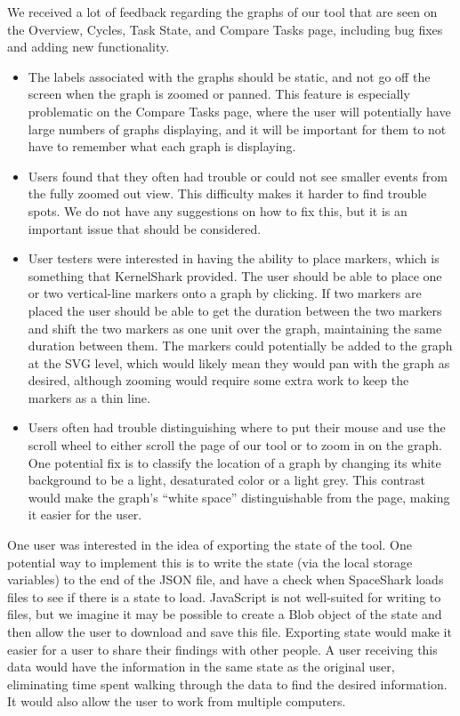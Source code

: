 \documentclass{hmcclinic}
\begin{document}
We received a lot of feedback regarding the graphs of our tool that are seen on the Overview, Cycles, Task State, and Compare Tasks page, including bug fixes and adding new functionality.
  \begin{itemize}

  \item The labels associated with the graphs should be static, and not go off the screen when 
  the graph is zoomed or panned. This feature is especially problematic on the Compare Tasks page, 
  where the user will potentially have large numbers of graphs displaying, and it will be 
  important for them to not have to remember what each graph is displaying.

  \item Users found that they often had trouble or could not see smaller events 
  from the fully zoomed out view. This difficulty makes it harder to find trouble spots. We do not 
  have any suggestions on how to fix this, but it is an important issue that should be 
  considered.

  \item User testers were interested in having the ability to place markers, which 
  is something that KernelShark provided. The user should be able to place one or two
   vertical-line markers onto a graph by clicking. If two markers are placed the user should
    be able to get the duration between the two markers and shift the two markers as one
     unit over the graph, maintaining the same duration between them. The markers could
      potentially be added to the graph at the SVG level, which would likely mean they 
      would pan with the graph as desired, although zooming would require some extra 
      work to keep the markers as a thin line.

  \item Users often had trouble distinguishing where to put their mouse and use the scroll wheel to either scroll the page of our tool or to zoom in on the graph. One potential fix 
   is to classify the location of a graph by changing its white background
     to be a light, desaturated color or a light grey. This contrast would make the
     graph's ``white
      space'' distinguishable from the page, making it easier for the user.

  \end{itemize}

One user was interested in the idea of exporting the state of the tool. One
potential way to implement this is to write the state (via the local storage
variables) to the end of the JSON file, and have a check when SpaceShark loads files to
see if there is a state to load. JavaScript is not
well-suited for writing to files, but we imagine it may be possible to
create a Blob object of the state and then allow the user to download and save
this file.  Exporting state would make it easier for a user to share their
findings with other people. A user receiving this data would have the
information in the same state as the original user, eliminating time spent
walking through the data to find the desired information. It would also allow
the user to work from multiple computers.
\end{document}
